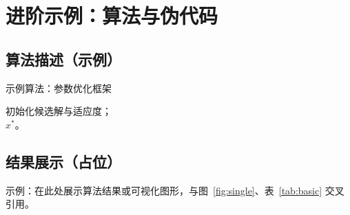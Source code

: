 \chapter{进阶示例：算法与伪代码}
\section{算法描述（示例）}
\begin{algorithm}[H]
\caption{示例算法：参数优化框架}
初始化候选解与适应度；\\
\KwRet $x^*$。
\end{algorithm}

\section{结果展示（占位）}
示例：在此处展示算法结果或可视化图形，与图~\ref{fig:single}、表~\ref{tab:basic} 交叉引用。

